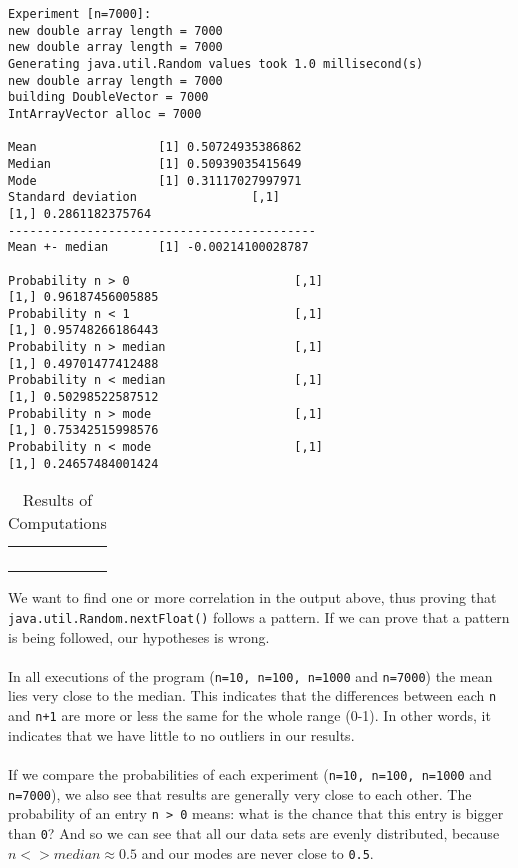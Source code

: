 \documentclass[
10pt, %
a4paper, %
oneside, %
headinclude,footinclude, %
BCOR5mm, %
]{scrartcl}
\begin{document}
\begin{lstlisting}[language={},label=results,caption=Ouput of the program]
Experiment [n=7000]: 
new double array length = 7000
new double array length = 7000
Generating java.util.Random values took 1.0 millisecond(s)
new double array length = 7000
building DoubleVector = 7000
IntArrayVector alloc = 7000

Mean                 [1] 0.50724935386862
Median               [1] 0.50939035415649
Mode                 [1] 0.31117027997971
Standard deviation                [,1]
[1,] 0.2861182375764
-------------------------------------------
Mean +- median       [1] -0.00214100028787

Probability n > 0                       [,1]
[1,] 0.96187456005885
Probability n < 1                       [,1]
[1,] 0.95748266186443
Probability n > median                  [,1]
[1,] 0.49701477412488
Probability n < median                  [,1]
[1,] 0.50298522587512
Probability n > mode                    [,1]
[1,] 0.75342515998576
Probability n < mode                    [,1]
[1,] 0.24657484001424
\end{lstlisting}

\begin{table}[]
\centering
\caption{Results of Computations}
\label{my-label}
\begin{tabular}{lllll}
 &  &  &  &  \\
 &  &  &  &  \\
 &  &  &  &  \\
 &  &  &  & 
\end{tabular}
\end{table}

We want to find one or more correlation in the output above, thus proving that \texttt{java.util.Random.nextFloat()} follows a pattern. If we can prove that a pattern is being followed, our hypotheses is wrong.
\\
\\
In all executions of the program (\texttt{n=10, n=100, n=1000} and \texttt{n=7000}) the mean lies very close to the median. This indicates that the differences between each \texttt{n} and \texttt{n+1} are more or less the same for the whole range (0-1). In other words, it indicates that we have little to no outliers in our results.
\\
\\
If we compare the probabilities of each experiment (\texttt{n=10, n=100, n=1000} and \texttt{n=7000}), we also see that results are generally very close to each other. The probability of an entry \texttt{n > 0} means: what is the chance that this entry is bigger than \texttt{0}? And so we can see that all our data sets are evenly distributed, because \texttt{$n <> median \approx 0.5$} and our modes are never close to \texttt{0.5}.
\end{document}
